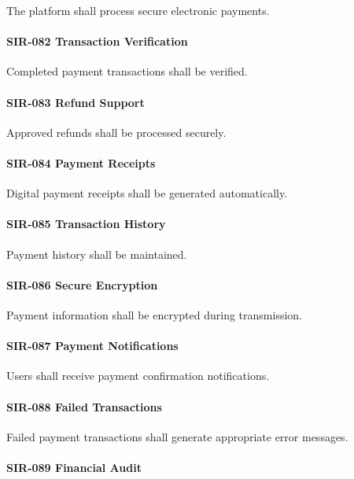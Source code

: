 The platform shall process secure electronic payments.

\paragraph{SIR-082 Transaction Verification}

Completed payment transactions shall be verified.

\paragraph{SIR-083 Refund Support}

Approved refunds shall be processed securely.

\paragraph{SIR-084 Payment Receipts}

Digital payment receipts shall be generated automatically.

\paragraph{SIR-085 Transaction History}

Payment history shall be maintained.

\paragraph{SIR-086 Secure Encryption}

Payment information shall be encrypted during transmission.

\paragraph{SIR-087 Payment Notifications}

Users shall receive payment confirmation notifications.

\paragraph{SIR-088 Failed Transactions}

Failed payment transactions shall generate appropriate error messages.

\paragraph{SIR-089 Financial Audit}

